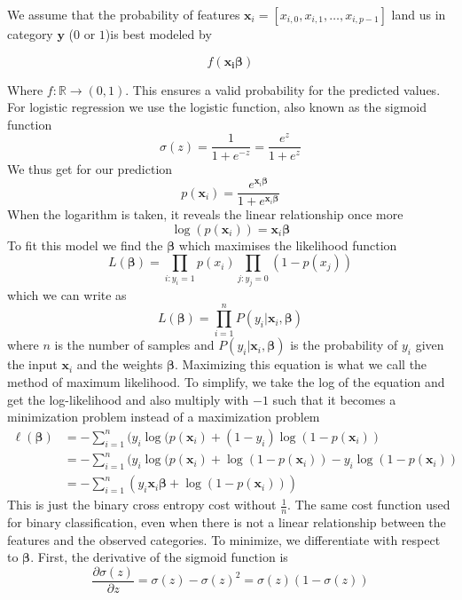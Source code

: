 \documentclass{article}
\theoremstyle{definition}
\begin{document}
We assume that the probability of features 
$\mathbf{x}_i = \left[x_{i,0}, x_{i, 1}, \ldots, x_{i, p-1} \right]$ land us in category $\mathbf{y}$ ($0$ or $1$)is best modeled by

\begin{equation*}
f(\mathbf{x_i}\bm{\beta})
\end{equation*}

Where $f: \mathbb{R} \to (0,1)$. This ensures a valid probability for the predicted values. For logistic regression we use the logistic function, also known as the sigmoid function 
\begin{equation*}
    \sigma(z) = \frac{1}{1 + e^{-z}} = \frac{e^{z}}{1 + e^z}
\end{equation*}
We thus get for our prediction
\begin{equation*}
    p(\mathbf{x}_i) = \frac{e^{\mathbf{x}_i\bm{\beta}}}{1 + e^{\mathbf{x}_i\bm{\beta}}}
\end{equation*}
When the logarithm is taken, it reveals the linear relationship once more
\begin{equation*}
    \log(p(\mathbf{x}_i)) = \mathbf{x}_i\bm{\beta}
\end{equation*}
To fit this model we find the $\bm{\beta}$ which maximises the likelihood function
\begin{equation*}
    L(\bm{\beta}) = \prod_{i: y_i = 1}p(x_i)\prod_{j:y_j = 0}(1-p(x_j))
\end{equation*}
which we can write as
\begin{equation*}
    L(\bm{\beta}) = \prod_{i=1}^{n}P(y_i | \mathbf{x}_i,\bm{\beta})
\end{equation*}
where $n$ is the number of samples and $P(y_i | \mathbf{x}_i,\bm{\beta})$ is the probability of $y_i$ given the input $\mathbf{x}_i$ and the weights $\bm{\beta}$. Maximizing this equation is what we call the method of maximum likelihood. To simplify, we take the log of the equation and get the log-likelihood and also multiply with $-1$ such that it becomes a minimization problem instead of a maximization problem
\begin{equation*}
    \begin{split}
        \ell(\bm{\beta}) & = -\sum_{i=1}^{n}(y_i\log(p(\mathbf{x}_i) + (1 - y_i)\log(1 - p(\mathbf{x}_i)) \\
        & = -\sum_{i=1}^{n}(y_i\log(p(\mathbf{x}_i) + \log(1 - p(\mathbf{x}_i)) - y_i\log(1 - p(\mathbf{x}_i)) \\
        & = -\sum_{i=1}^{n}(y_i\mathbf{x}_i\bm{\beta} + \log(1 - p(\mathbf{x}_i)))
    \end{split}
\end{equation*}
 This is just the binary cross entropy cost without $\frac{1}{n}$. The same cost function used for binary classification, even when there is not a linear relationship between the features and the observed categories. 
 To minimize, we differentiate with respect to $\bm{\beta}$. First, the derivative of the sigmoid function is
\begin{equation*}
    \frac{\partial \sigma(z)}{\partial z} = \sigma(z) - \sigma(z)^2 = \sigma(z)(1 - \sigma(z))
\end{equation*}
\end{document}
